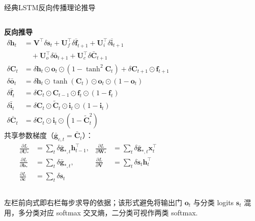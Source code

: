 \documentclass{模版}
\begin{document}
\begin{frame}{经典LSTM反向传播理论推导}
\begin{columns}[T,onlytextwidth]
  \vspace{3em}
  \textbf{反向推导}
  \begin{align*}
    \delta\symbf{h}_t &= \symbf{V}^{\top}\delta\symbf{s}_t
      + \symbf{U}_f^{\top}\delta\bar{\symbf{f}}_{t+1}
      + \symbf{U}_i^{\top}\delta\bar{\symbf{i}}_{t+1}\\
    &\quad + \symbf{U}_o^{\top}\delta\bar{\symbf{o}}_{t+1}
      + \symbf{U}_c^{\top}\delta\bar{\symbf{C}}_{t+1}\\
    \delta\symbf{C}_t &= \delta\symbf{h}_t\odot\symbf{o}_t\odot(1-\tanh^2\!\symbf{C}_t)
      + \delta\symbf{C}_{t+1}\odot\symbf{f}_{t+1}\\
    \delta\bar{\symbf{o}}_t &= \delta\symbf{h}_t\odot\tanh(\symbf{C}_t)\odot\symbf{o}_t\odot(1-\symbf{o}_t)\\
    \delta\bar{\symbf{f}}_t &= \delta\symbf{C}_t\odot\symbf{C}_{t-1}\odot\symbf{f}_t\odot(1-\symbf{f}_t)\\
    \delta\bar{\symbf{i}}_t &= \delta\symbf{C}_t\odot\tilde{\symbf{C}}_t\odot\symbf{i}_t\odot(1-\symbf{i}_t)\\
    \delta\bar{\symbf{C}}_t &= \delta\symbf{C}_t\odot\symbf{i}_t\odot(1-\tilde{\symbf{C}}_t^2)
  \end{align*}
  共享参数梯度（$\bar{\symbf{g}}_{c,t}=\bar{\symbf{C}}_t$）：
  \begin{align*}
    \frac{\partial L}{\partial \symbf{U}_{*}}&=\textstyle\sum_{t}\delta\bar{\symbf{g}}_{*,t}\symbf{h}_{t-1}^{\top}, &
    \frac{\partial L}{\partial \symbf{W}_{*}}&=\textstyle\sum_{t}\delta\bar{\symbf{g}}_{*,t}\symbf{x}_{t}^{\top}\\
    \frac{\partial L}{\partial \symbf{b}_{*}}&=\textstyle\sum_{t}\delta\bar{\symbf{g}}_{*,t}, &
    \frac{\partial L}{\partial \symbf{V}}&=\textstyle\sum_{t}\delta\symbf{s}_t \symbf{h}_t^{\top}\\
    \frac{\partial L}{\partial \symbf{c}}&=\textstyle\sum_{t}\delta\symbf{s}_t
  \end{align*}
\end{columns}
\par\smallskip
{\scriptsize 左栏前向式即右栏每步求导的依据；该形式避免将输出门 $\symbf{o}_t$ 与分类 logits $\symbf{s}_t$ 混用，多分类对应 softmax 交叉熵，二分类可视作两类 softmax.}
\end{frame}
\end{document}
